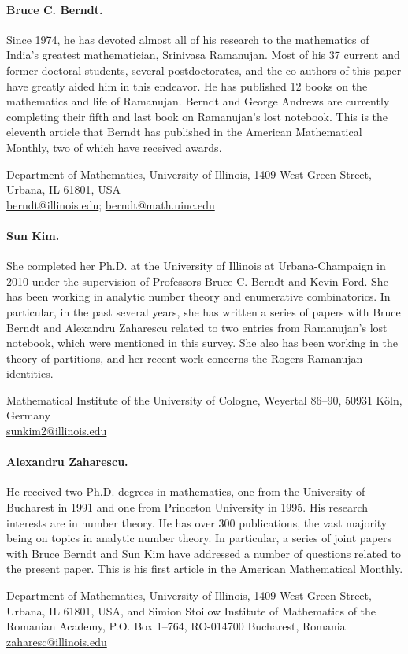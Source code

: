 \documentclass[10pt]{article}
\theoremstyle{plain}
\begin{document}
\paragraph{Bruce C. Berndt.} Since 1974, he has devoted almost all of his research to the mathematics of India's greatest mathematician, Srinivasa Ramanujan. Most of his 37 current and former doctoral students, several postdoctorates, and the co-authors of this paper have greatly aided him in this endeavor. He has published 12 books on the mathematics and life of Ramanujan. Berndt and George Andrews are currently completing their fifth and last book on Ramanujan's lost notebook. This is the eleventh article that Berndt has published in the American Mathematical Monthly, two of which have received awards.

Department of Mathematics, University of Illinois, 1409 West Green Street, Urbana, IL 61801, USA\\
\href{mailto:berndt@illinois.edu}{berndt@illinois.edu}; \href{mailto:berndt@math.uiuc.edu}{berndt@math.uiuc.edu}

\paragraph{Sun Kim.} She completed her Ph.D. at the University of Illinois at Urbana-Champaign in 2010 under the supervision of Professors Bruce C. Berndt and Kevin Ford. She has been working in analytic number theory and enumerative combinatorics. In particular, in the past several years, she has written a series of papers with Bruce Berndt and Alexandru Zaharescu related to two entries from Ramanujan's lost notebook, which were mentioned in this survey. She also has been working in the theory of partitions, and her recent work concerns the Rogers-Ramanujan identities.

Mathematical Institute of the University of Cologne, Weyertal 86--90, 50931 Köln, Germany\\
\href{mailto:sunkim2@illinois.edu}{sunkim2@illinois.edu}

\paragraph{Alexandru Zaharescu.} He received two Ph.D. degrees in mathematics, one from the University of Bucharest in 1991 and one from Princeton University in 1995. His research interests are in number theory. He has over 300 publications, the vast majority being on topics in analytic number theory. In particular, a series of joint papers with Bruce Berndt and Sun Kim have addressed a number of questions related to the present paper. This is his first article in the American Mathematical Monthly.

Department of Mathematics, University of Illinois, 1409 West Green Street, Urbana, IL 61801, USA, and Simion Stoilow Institute of Mathematics of the Romanian Academy, P.O. Box 1--764, RO-014700 Bucharest, Romania\\
\href{mailto:zaharesc@illinois.edu}{zaharesc@illinois.edu}
\end{document}
